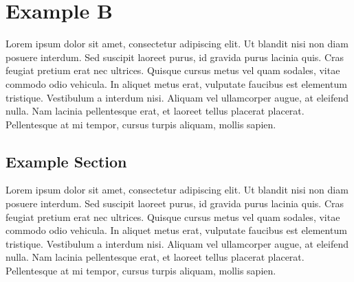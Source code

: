 
\chapter{Example B}

Lorem ipsum dolor sit amet, consectetur adipiscing elit. Ut blandit nisi non diam posuere interdum. Sed suscipit laoreet purus, id gravida purus lacinia quis. Cras feugiat pretium erat nec ultrices. Quisque cursus metus vel quam sodales, vitae commodo odio vehicula. In aliquet metus erat, vulputate faucibus est elementum tristique. Vestibulum a interdum nisi. Aliquam vel ullamcorper augue, at eleifend nulla. Nam lacinia pellentesque erat, et laoreet tellus placerat placerat. Pellentesque at mi tempor, cursus turpis aliquam, mollis sapien.

\section {Example Section}
Lorem ipsum dolor sit amet, consectetur adipiscing elit. Ut blandit nisi non diam posuere interdum. Sed suscipit laoreet purus, id gravida purus lacinia quis. Cras feugiat pretium erat nec ultrices. Quisque cursus metus vel quam sodales, vitae commodo odio vehicula. In aliquet metus erat, vulputate faucibus est elementum tristique. Vestibulum a interdum nisi. Aliquam vel ullamcorper augue, at eleifend nulla. Nam lacinia pellentesque erat, et laoreet tellus placerat placerat. Pellentesque at mi tempor, cursus turpis aliquam, mollis sapien.
